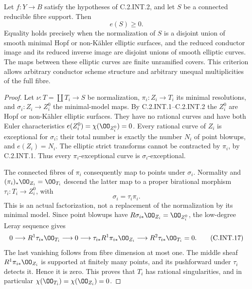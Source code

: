 \begin{theorem}
\label{st:C.2.INT.3}
Let $f:Y\to B$ satisfy the hypotheses of C.2.INT.2,
and let $S$ be a connected reducible fibre support.
Then
\[
 e(S)\ge0.
 \tag{C.INT.15}
\]
Equality holds precisely when the normalization of $S$
is a disjoint union of smooth minimal Hopf or
non-K\"ahler elliptic surfaces, and the reduced
conductor image and its reduced inverse image are
disjoint unions of smooth elliptic curves. The maps
between these elliptic curves are finite unramified
covers. This criterion allows arbitrary conductor
scheme structure and arbitrary unequal multiplicities
of the full fibre.
\end{theorem}
\begin{proof}
Let $\nu:T=\coprod T_i\to S$ be normalization,
$\pi_i:Z_i\to T_i$ its minimal resolutions, and
$\sigma_i:Z_i\to Z_i^0$ the minimal-model maps.
By C.2.INT.1--C.2.INT.2 the $Z_i^0$ are Hopf or
non-K\"ahler elliptic surfaces. They have no rational
curves and have both Euler characteristics
$e(Z_i^0)=\chi(\OO_{Z_i^0})=0$.
Every rational curve of $Z_i$ is exceptional for
$\sigma_i$; their total number is exactly the number
$N_i$ of point blowups, and $e(Z_i)=N_i$.
The elliptic strict transforms cannot be contracted
by $\pi_i$, by C.2.INT.1. Thus every
$\pi_i$-exceptional curve is $\sigma_i$-exceptional.

The connected fibres of $\pi_i$ consequently map to
points under $\sigma_i$. Normality and
$(\pi_i)_*\OO_{Z_i}=\OO_{T_i}$ descend the latter
map to a proper birational morphism
$\tau_i:T_i\to Z_i^0$, with
\[
 \sigma_i=\tau_i\pi_i.
 \tag{C.INT.16}
\]
This is an actual factorization, not a replacement
of the normalization by its minimal model.
Since point blowups have $R\sigma_{i*}\OO_{Z_i}
=\OO_{Z_i^0}$, the low-degree Leray sequence gives
\[
 0\longrightarrow R^1\tau_{i*}\OO_{T_i}
 \longrightarrow 0
 \longrightarrow \tau_{i*}R^1\pi_{i*}\OO_{Z_i}
 \longrightarrow R^2\tau_{i*}\OO_{T_i}=0.
 \tag{C.INT.17}
\]
The last vanishing follows from fibre dimension at
most one. The middle sheaf $R^1\pi_{i*}\OO_{Z_i}$
is supported at finitely many points, and its
pushforward under $\tau_i$ detects it. Hence it is
zero. This proves that $T_i$ has rational
singularities, and in particular
$\chi(\OO_{T_i})=\chi(\OO_{Z_i})=0$.


\end{proof}
